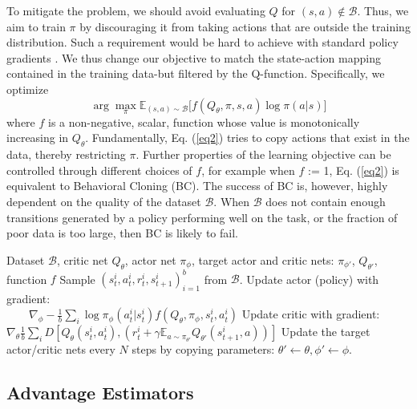 \documentclass[nohyperref]{article}
\theoremstyle{plain}
\theoremstyle{definition}
\theoremstyle{remark}
\begin{document}
To mitigate the problem, we should avoid evaluating $Q$ for $(s, a)\notin\mathcal{B}$. Thus, we aim to train $\pi$ by discouraging it from taking actions that are outside the training distribution. Such a requirement would be hard to achieve with standard policy gradients \cite{silver2014deterministic}. We thus change our objective to match the state-action mapping contained in the training data-but filtered by the Q-function. Specifically, we optimize
\begin{equation}\label{eq2}
    \arg\max_\pi \mathbb{E}_{(s,a)\sim\mathcal{B}}\Big[f(Q_\theta, \pi, s, a)\log\pi(a|s)\Big]
\end{equation}
where $f$ is a non-negative, scalar, function whose value is monotonically increasing in $Q_\theta$. Fundamentally, Eq. (\ref{eq2}) tries to copy actions that exist in the data, thereby restricting $\pi$. Further properties of the learning objective can be controlled through different choices of $f$, for example when $f$ := 1, Eq. (\ref{eq2}) is equivalent to Behavioral Cloning (BC). The success of BC is, however, highly dependent on the quality of the dataset $\mathcal{B}$. When $\mathcal{B}$ does not contain enough transitions generated by a policy performing well on the task, or the fraction of poor data is too large, then BC is likely to fail.


\begin{algorithm}[H]
   \caption{Critic Regularized Regression}
   \label{alg1}
\begin{algorithmic}
   Dataset $\mathcal{B}$, critic net $Q_\theta$, actor net $\pi_\phi$, target actor and critic nets: $\pi_{\phi'}$, $Q_{\theta'}$, function $f$
   \STATE Sample $(s_t^i, a_t^i, r_t^i, s_{t+1}^i)_{i=1}^b$ from $\mathcal{B}$.
   \STATE Update actor (policy) with gradient: \\$\qquad\nabla_\phi-\frac{1}{b}\sum_i\log\pi_\phi(a_t^i|s_t^i)f(Q_\theta, \pi_\phi, s_t^i, a_t^i)$
   \STATE Update critic with gradient: \\$\nabla_\theta\frac{1}{b}\sum_iD[Q_\theta(s_t^i, a_t^i), (r_t^i+\gamma\mathbb{E}_{a\sim\pi_{\theta'}}Q_{\theta'}(s_{t+1}^i, a))]$
   \STATE Update the target actor/critic nets every $N$ steps by copying parameters: $\theta'\leftarrow\theta, \phi'\leftarrow\phi$.
   \ENDFOR
\end{algorithmic}
\end{algorithm}



\subsection{Advantage Estimators} 
\end{document}
